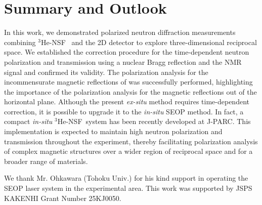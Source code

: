 \documentclass[%
 reprint,
superscriptaddress,
 amsmath,amssymb,
 aps,
floatfix,
]{revtex4-2}
\newcommand{\Hensf}{$^3$He-NSF}
\begin{document}
\section{Summary and Outlook}
In this work, we demonstrated polarized neutron diffraction measurements combining \Hensf~ and the 2D detector to explore three-dimensional reciprocal space.
We established the correction procedure for the time-dependent neutron polarization and transmission using a nuclear Bragg reflection and the NMR signal and confirmed its validity.
The polarization analysis for the incommensurate magnetic reflections of  was successfully performed, highlighting the importance of the polarization analysis for the magnetic reflections out of the horizontal plane.
Although the present \textit{ex-situ} method requires time-dependent correction, it is possible to upgrade it to the \textit{in-situ} SEOP method.
In fact, a compact \textit{in-situ} \Hensf~system has been recently developed at J-PARC\cite{takahashi_development_2025}.
This implementation is expected to maintain high neutron polarization and transmission throughout the experiment, thereby facilitating polarization analysis of complex magnetic structures over a wider region of reciprocal space and for a broader range of materials. 

\begin{acknowledgments}
We thank Mr. Ohkawara (Tohoku Univ.) for his kind support in operating the SEOP laser system in the experimental area.
This work was supported by JSPS KAKENHI Grant Number 25KJ0050.
\end{acknowledgments}

\appendix
\end{document}

